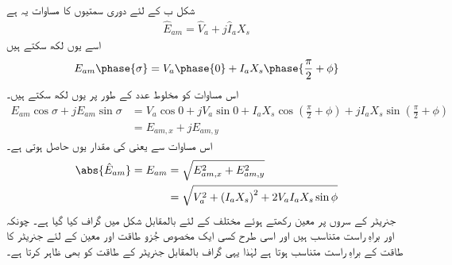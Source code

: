 %
شکل  ب کے لئے دوری سمتیوں کا مساوات یہ ہے
\begin{align}
\hat{E}_{am}=\hat{V}_a+j \hat{I}_a X_s
\end{align}
اسے یوں لکھ سکتے ہیں
\begin{align}
E_{am}\phase{\sigma}=V_a \phase{0} +I_a X_s \phase{\frac{\pi}{2}+\phi}
\end{align}
اس مساوات کو مخلوط عدد کے طور پر یوں لکھ سکتے ہیں۔
\begin{align*}
E_{am} \cos \sigma +j E_{am} \sin \sigma&=V_a \cos 0+j V_a \sin 0 + I_a X_s \cos \left(\frac{\pi}{2}+\phi \right)+j I_a X_s \sin \left(\frac{\pi}{2}+\phi \right)\\
&=E_{am,x}+j E_{am,y}
\end{align*}
اس مساوات سے  یعنی  کی مقدار یوں حاصل ہوتی ہے۔
\begin{gather}
\begin{aligned}
\abs{\hat{E}_{am}}=E_{am}&=\sqrt{E_{am,x}^2+E_{am,y}^2}\\
&=\sqrt{V_a^2+\left(I_a X_s\right)^2 +2 V_a I_a X_s \sin \phi}
\end{aligned}
\end{gather}
جنریٹر کے سروں پر معین  رکھتے ہوئے مختلف  کے لئے  بالمقابل  شکل  میں گراف کیا گیا ہے۔ چونکہ   اور   براہِ راست متناسب ہیں اور اسی طرح کسی ایک مخصوص جُزو طاقت اور معین  کے لئے جنریٹر کا طاقت  کے  براہِ راست متناسب ہوتا ہے لہٰذا یہی گراف  بالمقابل جنریٹر کے طاقت کو بھی ظاہر کرتا ہے۔

